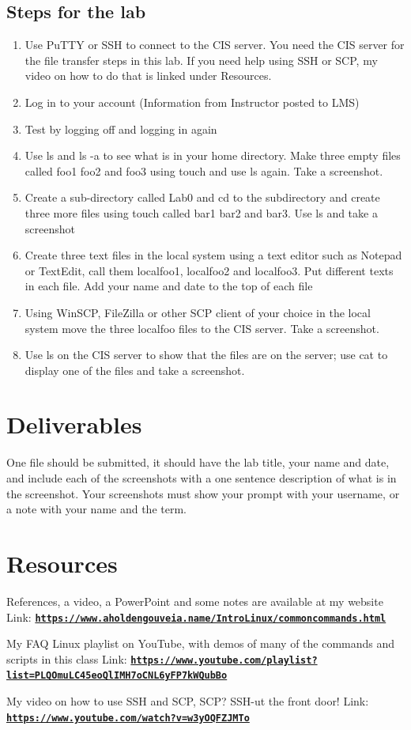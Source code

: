 \documentclass[12pt]{article}
\begin{document}
\subsection*{Steps for the lab}
    \begin{enumerate}
        \item Use PuTTY or SSH to connect to the CIS server. You need the CIS server for the file transfer steps in this lab. If you need help using SSH or SCP, my video on how to do that is linked under Resources.
        \item Log in to your account (Information from Instructor posted to LMS)
        \item Test by  logging off and logging in again
        \item Use ls and ls -a to see what is in your home directory. Make three empty files called foo1 foo2 and foo3 using touch and use ls again. Take a screenshot.
        \item Create a sub-directory called Lab0 and cd to the subdirectory and create three more files using touch called bar1 bar2 and bar3.  Use ls and take a screenshot
        \item Create three text files in the local system using a text editor such as Notepad or TextEdit, call them localfoo1, localfoo2 and localfoo3.  Put different texts in each file. Add your name and date to the top of each file
        \item Using WinSCP, FileZilla or other SCP client of your choice in the local system move the three localfoo files to the CIS server. Take a screenshot.
        \item Use ls on the CIS server to show that the files are on the server; use cat to display one of the files and take a screenshot.
    \end{enumerate}


\section*{Deliverables}
One file should be submitted, it should have the lab title, your name and date, and include each of the screenshots with a one sentence description of what is in the screenshot. Your screenshots must show your prompt with your username, or a note with your name and the term.
\section*{Resources}
References, a video, a PowerPoint and some notes are available at my website
Link: \href{https://www.aholdengouveia.name/IntroLinux/commoncommands.html}{\textbf{\nolinkurl{https://www.aholdengouveia.name/IntroLinux/commoncommands.html}}}

My FAQ Linux playlist on YouTube, with demos of many of the commands and scripts in this class
Link: \href{https://www.youtube.com/playlist?list=PLQOmuLC45eoQlIMH7oCNL6yFP7kWQubBo}{\textbf{\nolinkurl{https://www.youtube.com/playlist?list=PLQOmuLC45eoQlIMH7oCNL6yFP7kWQubBo}}}

My video on how to use SSH and SCP, SCP? SSH-ut the front door!
Link: \href{https://www.youtube.com/watch?v=w3yOQFZJMTo}{\textbf{\nolinkurl{https://www.youtube.com/watch?v=w3yOQFZJMTo}}}
\end{document}
